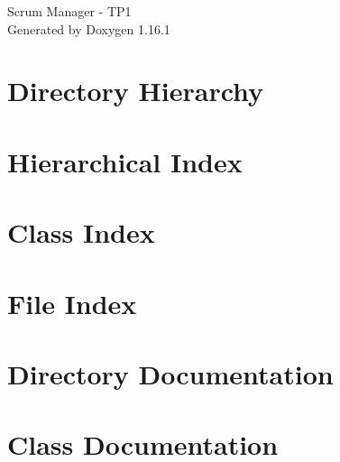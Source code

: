 \documentclass[twoside]{book}
\newcommand{\+}{\discretionary{\mbox{\scriptsize$\hookleftarrow$}}{}{}}
\newcommand{\clearemptydoublepage}{%
    \newpage{\pagestyle{empty}\cleardoublepage}%
  }
\begin{document}
  \raggedbottom
    \hypersetup{pageanchor=false,
                bookmarksnumbered=true,
                pdfencoding=unicode
               }
  \begin{titlepage}
  \vspace*{7cm}
  \begin{center}%
  {\Large Scrum Manager -\/ TP1}\\
  \vspace*{1cm}
  {\large Generated by Doxygen 1.16.1}\\
  \end{center}
  \end{titlepage}
  \clearemptydoublepage
  \tableofcontents
  \clearemptydoublepage
  \hypersetup{pageanchor=true}
\chapter{Directory Hierarchy}

\chapter{Hierarchical Index}

\chapter{Class Index}

\chapter{File Index}

\chapter{Directory Documentation}



\chapter{Class Documentation}















\end{document}
